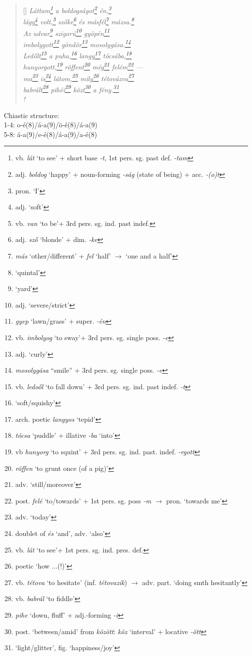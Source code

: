 \documentclass[a4paper,12pt,twoside,final]{book}
\begin{document}
\begin{verse}[\versewidth]
  \it
  Láttam\footnote{vb. \emph{lát} `to see' +
  short base \emph{-t}, 1st pers. sg. past def. \emph{-tam}} a
  boldogságot\footnote{adj. \emph{boldog} `happy' + noun-forming
  \emph{-ság} (state of being) + acc. \emph{-(o)t}}
  én,\footnote{pron. `I'} \\
  lágy\footnote{adj. `soft'} volt,\footnote{vb. \emph{van} `to
  be'+ 3rd pers. sg. ind. past indef.} szőke\footnote{adj. \emph{sző}
  `blonde' + dim. \emph{-ke}} és másfél\footnote{\emph{más}
  `other/different' + \emph{fel} `half' $\rightarrow$ `one and a
  half'} mázsa.\footnote{`quintal'} \\
  Az udvar\footnote{`yard'} szigorú\footnote{adj. `severe/strict'}
  gyöpén\footnote{\emph{gyep} `lawn/grass' + super. \emph{-én}}  \\
  imbolygott\footnote{vb. \emph{imbolyog} `to sway'+ 3rd
  pers. sg. single poss. \emph{-e}} göndör\footnote{adj. `curly'}
  mosolygása.\footnote{\emph{mosolygása} ``smile'' + 3rd
  pers. sg. single poss. \emph{-e}} \\
  Ledőlt\footnote{vb. \emph{ledoől} `to fall down' + 3rd
  pers. sg. ind. past indef. \emph{-t}} a puha,\footnote{`soft/squishy'}
  langy\footnote{arch. poetic \emph{langyos} `tepid'}
  tócsába,\footnote{\emph{tócsa} `puddle' + illative \emph{-ba}
  `into'} \\
  hunyorgott,\footnote{vb \emph{hunyorg} `to squint' + 3rd
  pers. sg. ind. past. indef. \emph{-rgott}}
  röffent\footnote{\emph{röffen} `to grunt once (of a pig)'}
  még\footnote{adv. `still/moreover'} felém\footnote{post. \emph{felé}
  `to/towards' + 1st pers. sg. poss \emph{-m} $\rightarrow$
  pron. `towards me'} --- \\
  ma\footnote{adv. `today'} is\footnote{doublet of \emph{és} `and',
  adv. `also'} látom,\footnote{vb. \emph{lát} `to see'+ 1st
  pers. sg. ind. pres. def.} mily\footnote{poetic `how ...(!)'}
  tétovázva\footnote{vb. \emph{tétova} `to hesitate'
  (inf. \emph{tétovazik}) $\rightarrow$ adv. part. `doing smth
  hesitantly'} \\
  babrált\footnote{vb. \emph{babrál} `to fiddle'}
  pihéi\footnote{\emph{pihe} `down, fluff' + adj.-forming \emph{-i}}
  közt\footnote{post. `between/amid' from \emph{között}: \emph{köz}
  `interval' + locative \emph{-ött}} a fény.\footnote{`light/glitter',
  fig. `happiness/joy'} \\!
\end{verse}

\noindent Chiastic structure: \\
1-4: o-é(8)/á-a(9)/ö-é(8)/á-a(9) \\
5-8: á-a(9)/e-é(8)/á-a(9)/a-é(8)
\end{document}
